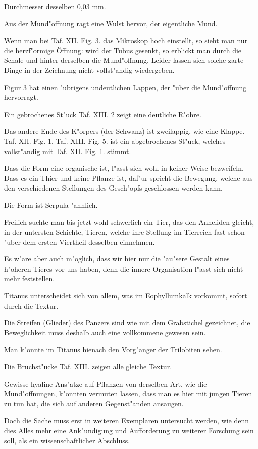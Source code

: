 \documentclass[a4paper, 11pt, oneside, german]{article}
\begin{document}
Durchmesser desselben 0,03 mm.

Aus der Mund"offnung ragt eine Wulst hervor, der eigentliche Mund.

Wenn man bei Taf. XII. Fig. 3. das Mikroskop hoch einstellt, so sieht man nur die herzf"ormige Öffnung: wird der Tubus gesenkt, so erblickt man durch die Schale und hinter derselben die Mund"offnung. Leider lassen sich solche zarte Dinge in der Zeichnung nicht vollst"andig wiedergeben.

Figur 3 hat einen "ubrigens undeutlichen Lappen, der "uber die Mund"offnung hervorragt.

Ein gebrochenes St"uck Taf. XIII. 2 zeigt eine deutliche R"ohre.

Das andere Ende des K"orpers (der Schwanz) ist zweilappig, wie eine Klappe. Taf. XII. Fig. 1. Taf. XIII. Fig. 5. ist ein abgebrochenes St"uck, welches vollst"andig mit Taf. XII. Fig. 1. stimmt.

Dass die Form eine organische ist, l"asst sich wohl in keiner Weise bezweifeln. Dass es ein Thier und keine Pflanze ist, daf"ur spricht die Bewegung, welche aus den verschiedenen Stellungen des Gesch"opfs geschlossen werden kann.

Die Form ist Serpula "ahnlich.

Freilich suchte man bis jetzt wohl schwerlich ein Tier, das den Anneliden gleicht, in der untersten Schichte, Tieren, welche ihre Stellung im Tierreich fast schon "uber dem ersten Viertheil desselben einnehmen.

Es w"are aber auch m"oglich, dass wir hier nur die "au"sere Gestalt eines h"oheren Tieres vor uns haben, denn die innere Organisation l"asst sich nicht mehr feststellen.

Titanus unterscheidet sich von allem, was im Eophyllumkalk vorkommt, sofort durch die Textur.

Die Streifen (Glieder) des Panzers sind wie mit dem Grabstichel gezeichnet, die Beweglichkeit muss deshalb auch eine vollkommene gewesen sein.

Man k"onnte im Titanus hienach den Vorg"anger der Trilobiten sehen.

Die Bruchst"ucke Taf. XIII. zeigen alle gleiche Textur.

Gewisse hyaline Ans"atze auf Pflanzen von derselben Art, wie die Mund"offnungen, k"onnten vermuten lassen, dass man es hier mit jungen Tieren zu tun hat, die sich auf anderen Gegenst"anden ansaugen.

Doch die Sache muss erst in weiteren Exemplaren untersucht werden, wie denn dies Alles mehr eine Ank"undigung und Aufforderung zu weiterer Forschung sein soll, als ein wissenschaftlicher Abschluss.
\end{document}
